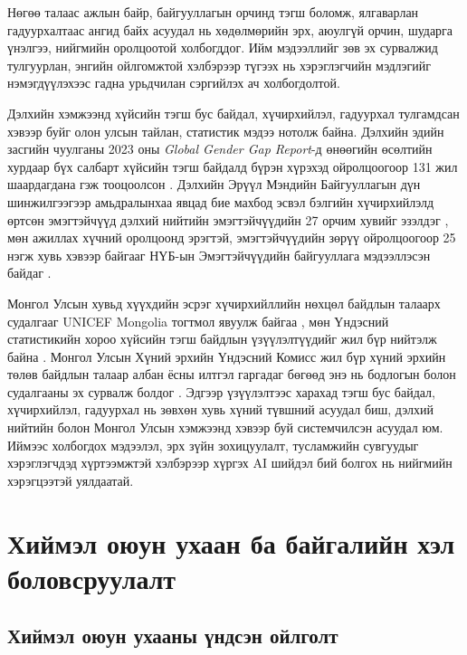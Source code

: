 Нөгөө талаас ажлын байр, байгууллагын орчинд тэгш боломж, ялгаварлан гадуурхалтаас ангид байх асуудал нь хөдөлмөрийн эрх, аюулгүй орчин, шударга үнэлгээ, нийгмийн оролцоотой холбогддог. Ийм мэдээллийг зөв эх сурвалжид тулгуурлан, энгийн ойлгомжтой хэлбэрээр түгээх нь хэрэглэгчийн мэдлэгийг нэмэгдүүлэхээс гадна урьдчилан сэргийлэх ач холбогдолтой.

Дэлхийн хэмжээнд хүйсийн тэгш бус байдал, хүчирхийлэл, гадуурхал тулгамдсан хэвээр буйг олон улсын тайлан, статистик мэдээ нотолж байна. Дэлхийн эдийн засгийн чуулганы 2023 оны \textit{Global Gender Gap Report}-д өнөөгийн өсөлтийн хурдаар бүх салбарт хүйсийн тэгш байдалд бүрэн хүрэхэд ойролцоогоор 131 жил шаардагдана гэж тооцоолсон \cite{wef_gender_gap}. Дэлхийн Эрүүл Мэндийн Байгууллагын дүн шинжилгээгээр амьдралынхаа явцад бие махбод эсвэл бэлгийн хүчирхийлэлд өртсөн эмэгтэйчүүд дэлхий нийтийн эмэгтэйчүүдийн 27 орчим хувийг эзэлдэг \cite{who_vaw_2021}, мөн ажиллах хүчний оролцоонд эрэгтэй, эмэгтэйчүүдийн зөрүү ойролцоогоор 25 нэгж хувь хэвээр байгааг НҮБ-ын Эмэгтэйчүүдийн байгууллага мэдээллэсэн байдаг \cite{gender_equality_general, unwomen_facts}. 

Монгол Улсын хувьд хүүхдийн эсрэг хүчирхийллийн нөхцөл байдлын талаарх судалгааг UNICEF Mongolia тогтмол явуулж байгаа \cite{unicef_mongolia_violence}, мөн Үндэсний статистикийн хороо хүйсийн тэгш байдлын үзүүлэлтүүдийг жил бүр нийтэлж байна \cite{nso_mongolia_gender}. Монгол Улсын Хүний эрхийн Үндэсний Комисс жил бүр хүний эрхийн төлөв байдлын талаар албан ёсны илтгэл гаргадаг бөгөөд энэ нь бодлогын болон судалгааны эх сурвалж болдог \cite{nhrcm_report}. Эдгээр үзүүлэлтээс харахад тэгш бус байдал, хүчирхийлэл, гадуурхал нь зөвхөн хувь хүний түвшний асуудал биш, дэлхий нийтийн болон Монгол Улсын хэмжээнд хэвээр буй системчилсэн асуудал юм. Иймээс холбогдох мэдээлэл, эрх зүйн зохицуулалт, тусламжийн сувгуудыг хэрэглэгчдэд хүртээмжтэй хэлбэрээр хүргэх AI шийдэл бий болгох нь нийгмийн хэрэгцээтэй уялдаатай.


\section{Хиймэл оюун ухаан ба байгалийн хэл боловсруулалт}

\subsection{Хиймэл оюун ухааны үндсэн ойлголт}

